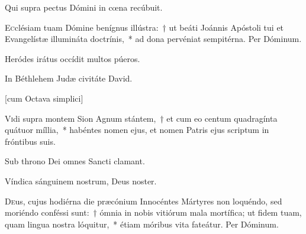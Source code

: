 \documentclass[vesperale_romanum.tex]{subfiles}
\begin{document}
\rr Qui supra pectus Dómini in cœna recúbuit.

\admagnificat


\oratio \label{oratio_s_joannis_dec_27} 

\lettrine{E}{c}clésiam tuam Dómine benígnus illústra:~† ut beáti Joánnis Apóstoli tui et Evangelístæ illumináta doctrínis,~* ad dona pervéniat sempitérna.
Per Dóminum.

\label{an_hi_sunt_qui_cum_mulieribus_solesmes_1961}
{}

\vv Heródes irátus occídit multos púeros.

\rr In Béthlehem Judæ civitáte David.



 \label{dec_28}


[cum Octava simplici]


\lettrine{V}{i}di supra montem Sion Agnum stántem,~† et cum eo centum quadragínta quátuor míllia,~* habéntes nomen ejus, et nomen Patris ejus scriptum in fróntibus suis.

\hymnus


\vv Sub throno Dei omnes Sancti clamant.

\rr Víndica sánguinem nostrum, Deus noster.

\admagnificat


\oratio \label{oratio_28_dec} 

\lettrine{D}{e}us, cujus hodiérna die præcónium Innocéntes Mártyres non loquéndo, sed moriéndo conféssi sunt:~† ómnia in nobis vitiórum mala mortífica; ut fidem tuam, quam lingua nostra lóquitur,~* étiam móribus vita fateátur. Per Dóminum.
\end{document}
